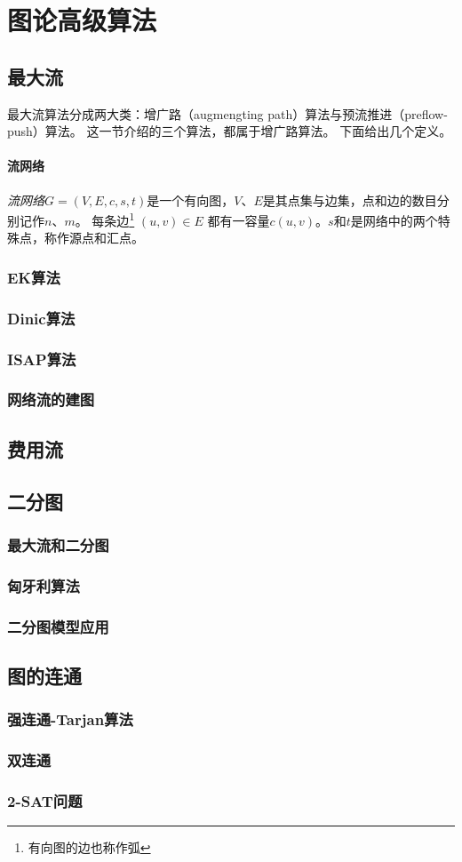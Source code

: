 \documentclass[fontset=ubuntu]{ctexbook}
\begin{document}
    \chapter{图论高级算法}
    \section{最大流}
    最大流算法分成两大类：增广路（augmengting path）算法与预流推进（preflow-push）算法。
    这一节介绍的三个算法，都属于增广路算法。
    下面给出几个定义。
    \subsubsection*{流网络}
    \emph{流网络}$G=(V,E,c,s,t)$是一个有向图，$V$、$E$是其点集与边集，点和边的数目分别记作$n$、$m$。 每条边\footnote{有向图的边也称作弧} $(u,v)\in E$ 都有一容量$c(u,v)$。$s$和$t$是网络中的两个特殊点，称作源点和汇点。
    
    \subsection{EK算法}
    \subsection{Dinic算法}
    \subsection{ISAP算法}
    \subsection{网络流的建图}
    \section{费用流}
    \section{二分图}
    \subsection{最大流和二分图}
    \subsection{匈牙利算法}
    \subsection{二分图模型应用}
    \section{图的连通}
    \subsection{强连通-Tarjan算法}
    \subsection{双连通}
    \subsection{2-SAT问题}
\end{document}
